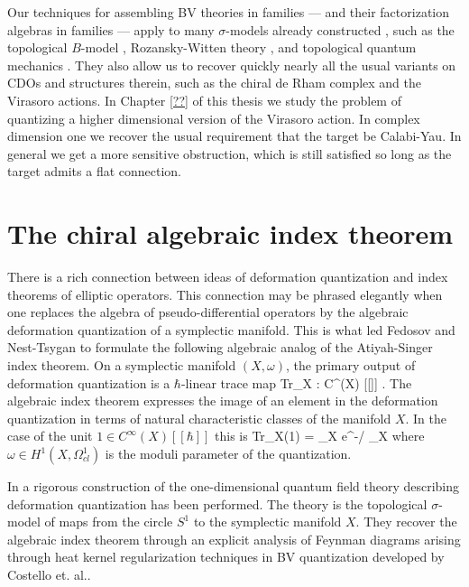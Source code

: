\documentclass[10pt]{amsart}
\begin{document}
Our techniques for assembling BV theories in families --- and their factorization algebras in families --- apply to many $\sigma$-models already constructed , such as the topological $B$-model \cite{LiLi}, Rozansky-Witten theory \cite{CLL}, and topological quantum mechanics \cite{GG1, GLL}. 
They also allow us to recover quickly nearly all the usual variants on CDOs and structures therein, such as the chiral de Rham complex and the Virasoro actions.
In Chapter \ref{??} of this thesis we study the problem of quantizing a higher dimensional version of the Virasoro action. 
In complex dimension one we recover the usual requirement that the target be Calabi-Yau. 
In general we get a more sensitive obstruction, which is still satisfied so long as the target admits a flat connection.

\section{The chiral algebraic index theorem}

There is a rich connection between ideas of deformation quantization and index theorems of elliptic operators. 
This connection may be phrased elegantly when one replaces the algebra of pseudo-differential operators by the algebraic deformation quantization of a symplectic manifold.
This is what led Fedosov \cite{Fedosov} and Nest-Tsygan \cite{NT} to formulate the following algebraic analog of the Atiyah-Singer index theorem.
On a symplectic manifold $(X, \omega)$, the primary output of deformation quantization is a $\hbar$-linear trace map
\ben
{\rm Tr}_X : C^\infty(X) [[\hbar]] \to \CC[[\hbar,\hbar^{-1}] .
\een
The algebraic index theorem expresses the image of an element in the deformation quantization in terms of natural characteristic classes of the manifold $X$.
In the case of the unit $1 \in C^\infty(X) [[\hbar]]$ this is
\ben
{\rm Tr}_X(1) = \int_{X} e^{-\omega/\hbar} _X 
\een
where $\omega \in H^1 (X, \Omega^1_{cl})$ is the moduli parameter of the quantization.

In \cite{GLL} a rigorous construction of the one-dimensional quantum field theory describing deformation quantization has been performed. 
The theory is the topological $\sigma$-model of maps from the circle $S^1$ to the symplectic manifold $X$. 
They recover the algebraic index theorem through an explicit analysis of Feynman diagrams arising through heat kernel regularization techniques in BV quantization developed by Costello et. al..
\end{document}
